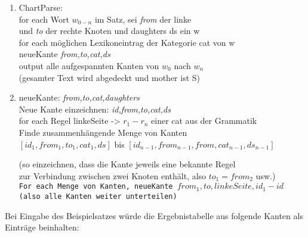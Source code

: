 \documentclass[12pt]{paper}
\begin{document}
\begin{enumerate} \tt
\item 
ChartParse: \\
for each Wort $w_{0-n}$ im Satz, sei \textit{from} der linke \\
und \textit{to} der rechte Knoten und daughters ds ein w \\
\hspace*{.2cm} for each möglichen Lexikoneintrag der Kategorie cat von w \\
\hspace*{.4cm} neueKante \textit{from,to,cat,ds} \\
output alle aufgespannten Kanten von $w_{0}$ nach $w_{n}$ \\ \rm(gesamter Text wird abgedeckt und mother ist S)\tt
\item 
neueKante: \textit{from,to,cat,daughters} \\
Neue Kante einzeichnen: \textit{id,from,to,cat,ds} \\
for each Regel linkeSeite -> $r_{1}-r_{n}$ einer cat aus der Grammatik \\
\hspace*{.2cm} Finde zusammenhängende Menge von Kanten \\
\hspace*{.2cm} $[id_{1},from_{1},to_{1},cat_{1},ds]$ bis $[id_{n-1},from_{n-1},from,cat_{n-1},ds_{n-1}]$ 

\rm(so einzeichnen, dass die Kante jeweils  eine bekannte Regel \\
zur Verbindung zwischen zwei Knoten enthält, also $to_{1}=from_{2}$ usw.)\tt \\
\hspace*{.2cm} For each Menge von Kanten, neueKante $from_{1},to,linkeSeite,id_{1}-id$ \rm(also alle Kanten weiter unterteilen)
\end{enumerate}
Bei Eingabe des Beispielsatzes würde die Ergebnistabelle aus \cite{cop04} folgende Kanten als Einträge beinhalten:
\end{document}
